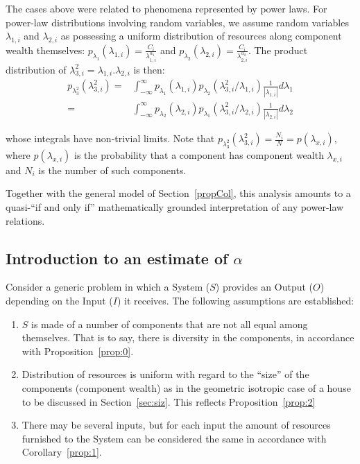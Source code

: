 \documentclass[10pt,letterpaper]{article}
\begin{document}
The cases above were related to phenomena represented by power laws.
For power-law distributions involving random variables, we assume
random variables
$\lambda_{1,i}$ and $\lambda_{2,i}$ as possessing a uniform distribution of resources along component wealth
themselves:
$p_{\lambda_{1}}(\lambda_{1,i})=\frac{C_i}{\lambda_{1,i}^{\alpha_1}}$
and
$p_{\lambda_{2}}(\lambda_{2,i})=\frac{C_i}{\lambda_{2,i}^{\alpha_2}}$.
The product distribution of
$\lambda_{3,i}^2=\lambda_{1,i}.\lambda_{2,i}$
is then:
\begin{align}
	p_{\lambda_3^2}(\lambda_{3,i}^2) = & \int_{-\infty}^{\infty} p_{\lambda_1}(\lambda_{1,i}) p_{\lambda_2}(\lambda_{3,i}^2/\lambda_{1,i})\frac{1}{|\lambda_{1,i}|}d\lambda_1 \\
	= & \int_{-\infty}^{\infty} p_{\lambda_2}(\lambda_{2,i}) p_{\lambda_1}(\lambda_{3,i}^2/\lambda_{2,i})\frac{1}{|\lambda_{2,i}|}d\lambda_2
\end{align}

\noindent whose integrals have non-trivial limits.
Note that $p_{\lambda_3^2}(\lambda_{3,i}^2)=\frac{N_i}{N}=p(\lambda_{x,i})$,
where $p(\lambda_{x,i})$ is the probability that a component has component wealth $\lambda_{x,i}$ and $N_i$ is the number of such components. 


Together with the general model of Section~\ref{propCol}, this analysis amounts to a quasi-``if and only if'' mathematically grounded interpretation of any power-law relations.

\subsection{Introduction to an estimate of $\alpha$}
Consider a generic problem in which a System ($S$) provides an Output ($O$) depending on the Input ($I$) it receives.
The following assumptions are established:
\begin{enumerate}
	\item $S$ is made of a number of components that are not all equal among themselves.
That is to say, there is diversity in the components, in accordance with Proposition~\ref{prop:0}. 
\item Distribution of resources is uniform with regard to the ``size'' of the components (component wealth) as in the geometric isotropic case of a house to be discussed in Section~\ref{sec:siz}.
This reflects Proposition~\ref{prop:2}
\item There may be several inputs, but for each input the amount of resources furnished to the System can be considered the same 
	in accordance with Corollary~\ref{prop:1}.
\end{enumerate}
\end{document}
